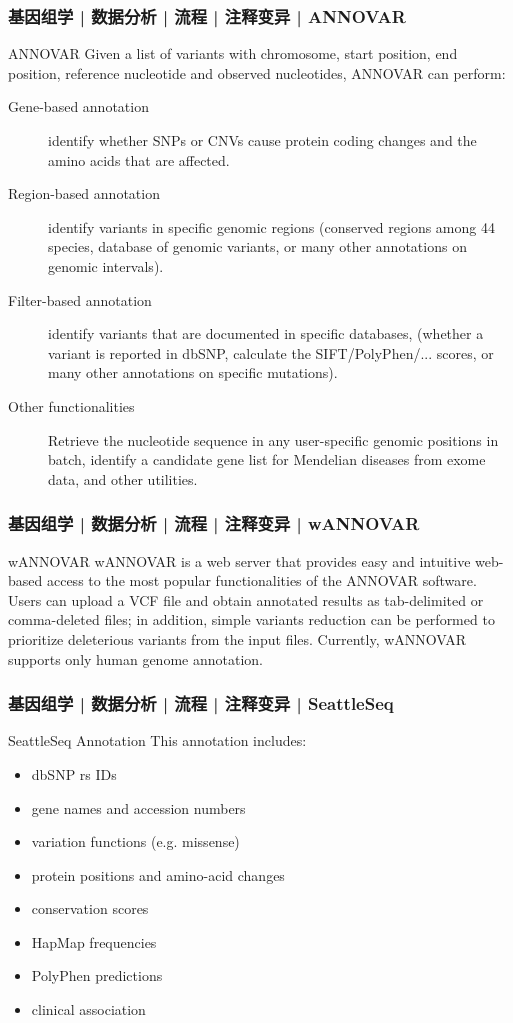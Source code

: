 \begin{frame}
  \frametitle{基因组学 | 数据分析 | 流程 | 注释变异 | ANNOVAR}
  \begin{block}{ANNOVAR}
    Given a list of variants with chromosome, start position, end position, reference nucleotide and observed nucleotides, ANNOVAR can perform:
    {\footnotesize
      \begin{description}
      \item[Gene-based annotation] identify whether SNPs or CNVs cause protein coding changes and the amino acids that are affected.
      \item[Region-based annotation] identify variants in specific genomic regions (conserved regions among 44 species, database of genomic variants, or many other annotations on genomic intervals).
      \item[Filter-based annotation] identify variants that are documented in specific databases, (whether a variant is reported in dbSNP, calculate the SIFT/PolyPhen/... scores, or many other annotations on specific mutations).
      \item[Other functionalities] Retrieve the nucleotide sequence in any user-specific genomic positions in batch, identify a candidate gene list for Mendelian diseases from exome data, and other utilities.
    \end{description}
    }
  \end{block}
\end{frame}

\begin{frame}
  \frametitle{基因组学 | 数据分析 | 流程 | 注释变异 | wANNOVAR}
  \begin{block}{wANNOVAR}
  wANNOVAR is a web server that provides easy and intuitive web-based access to the most popular functionalities of the ANNOVAR software. Users can upload a VCF file and obtain annotated results as tab-delimited or comma-deleted files; in addition, simple variants reduction can be performed to prioritize deleterious variants from the input files. Currently, wANNOVAR supports only human genome annotation.
  \end{block}
\end{frame}

\begin{frame}
  \frametitle{基因组学 | 数据分析 | 流程 | 注释变异 | SeattleSeq}
  \begin{block}{SeattleSeq Annotation}
  This annotation includes:
  \begin{itemize}
    \item dbSNP rs IDs
    \item gene names and accession numbers
    \item variation functions (e.g. missense)
    \item protein positions and amino-acid changes
    \item conservation scores
    \item HapMap frequencies
    \item PolyPhen predictions
    \item clinical association
  \end{itemize}
  \end{block}
\end{frame}

